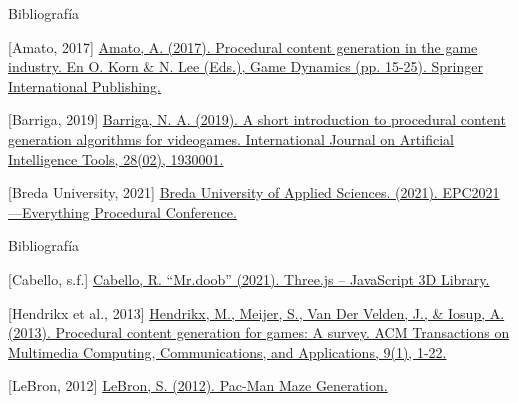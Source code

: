 \documentclass{beamer}
\begin{document}
    \begin{frame}{Bibliografía \scriptsize{\hfill \secname}}
        \begin{thebibliography}{1}
        
    
    	
    	[Amato, 2017] \href{https://doi.org/10.1007/978-3-319-53088-8_2}{Amato, A. (2017). Procedural content generation in the game industry. En O. Korn \& N. Lee (Eds.), Game Dynamics (pp. 15-25). Springer International Publishing.}
        
        
    	
    	[Barriga, 2019] \href{https://doi.org/10.1142/S0218213019300011}{Barriga, N. A. (2019). A short introduction to procedural content generation algorithms for videogames. International Journal on Artificial Intelligence Tools, 28(02), 1930001.}
    	
    	
    	[Breda University, 2021] \href{http://everythingprocedural.com/}{Breda University of Applied Sciences. (2021). EPC2021—Everything Procedural Conference.}
        
        \end{thebibliography}
    \end{frame}
    
    \begin{frame}{Bibliografía \scriptsize{\hfill \secname}}
        \begin{thebibliography}{1}
        
    	
    	[Cabello, s.f.] \href{https://threejs.org/}{Cabello, R. ``Mr.doob'' (2021). Three.js – JavaScript 3D Library.}
    	
    	
    	
    	[Hendrikx et al., 2013] \href{https://doi.org/10.1145/2422956.2422957}{Hendrikx, M., Meijer, S., Van Der Velden, J., \& Iosup, A. (2013). Procedural content generation for games: A survey. ACM Transactions on Multimedia Computing, Communications, and Applications, 9(1), 1-22.}
    	
    	
    	
        [LeBron, 2012] \href{https://shaunlebron.github.io/pacman-mazegen/}{LeBron, S. (2012). Pac-Man Maze Generation.}
        
        \end{thebibliography}
    \end{frame}
    
\end{document}
